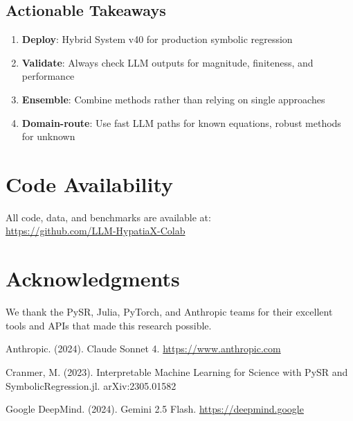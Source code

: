 \documentclass[11pt,a4paper]{article}
\begin{document}
\subsection{Actionable Takeaways}

\begin{enumerate}
    \item \textbf{Deploy}: Hybrid System v40 for production symbolic regression
    \item \textbf{Validate}: Always check LLM outputs for magnitude, finiteness, and performance
    \item \textbf{Ensemble}: Combine methods rather than relying on single approaches
    \item \textbf{Domain-route}: Use fast LLM paths for known equations, robust methods for unknown
\end{enumerate}

\section*{Code Availability}

All code, data, and benchmarks are available at:\\
\url{https://github.com/LLM-HypatiaX-Colab}

\section*{Acknowledgments}

We thank the PySR, Julia, PyTorch, and Anthropic teams for their excellent tools and APIs that made this research possible.

\begin{thebibliferences}

Anthropic. (2024). Claude Sonnet 4. \url{https://www.anthropic.com}

Cranmer, M. (2023). Interpretable Machine Learning for Science with PySR and SymbolicRegression.jl. arXiv:2305.01582

Google DeepMind. (2024). Gemini 2.5 Flash. \url{https://deepmind.google}

\end{thebibliferences}
\end{document}
